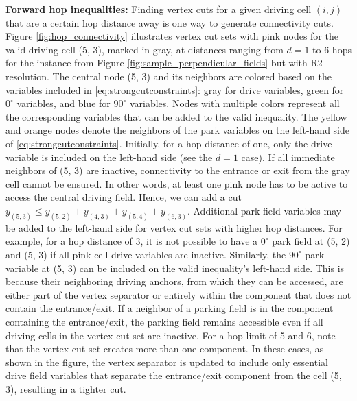 \documentclass[10pt]{article}
\theoremstyle{definition}
\begin{document}
\textbf{Forward hop inequalities:} Finding vertex cuts for a given driving cell $(i, j)$ that are a certain hop distance away is one way to generate connectivity cuts. Figure \ref{fig:hop_connectivity} illustrates vertex cut sets with pink nodes for the valid driving cell (5, 3), marked in gray, at distances ranging from $d=1$ to 6 hops for the instance from Figure \ref{fig:sample_perpendicular_fields} but with R2 resolution. The central node (5, 3) and its neighbors are colored based on the variables included in \eqref{eq:strongcutconstraints}: gray for drive variables, green for $0^{\circ}$ variables, and blue for $90^{\circ}$ variables. Nodes with multiple colors represent all the corresponding variables that can be added to the valid inequality. The yellow and orange nodes denote the neighbors of the park variables on the left-hand side of \eqref{eq:strongcutconstraints}. Initially, for a hop distance of one, only the drive variable is included on the left-hand side (see the $d=1$ case). If all immediate neighbors of (5, 3) are inactive, connectivity to the entrance or exit from the gray cell cannot be ensured. In other words, at least one pink node has to be active to access the central driving field. Hence, we can add a cut $y_{(5, 3)} \leq y_{(5,2)} + y_{(4, 3)} + y_{(5,4)} + y_{(6,3)}$. Additional park field variables may be added to the left-hand side for vertex cut sets with higher hop distances. For example, for a hop distance of 3, it is not possible to have a $0^{\circ}$ park field at (5, 2) and (5, 3) if all pink cell drive variables are inactive. Similarly, the $90^{\circ}$ park variable at (5, 3) can be included on the valid inequality's left-hand side. This is because their neighboring driving anchors, from which they can be accessed, are either part of the vertex separator or entirely within the component that does not contain the entrance/exit. If a neighbor of a parking field is in the component containing the entrance/exit, the parking field remains accessible even if all driving cells in the vertex cut set are inactive. For a hop limit of 5 and 6, note that the vertex cut set creates more than one component. In these cases, as shown in the figure, the vertex separator is updated to include only essential drive field variables that separate the entrance/exit component from the cell (5, 3), resulting in a tighter cut.
\end{document}
